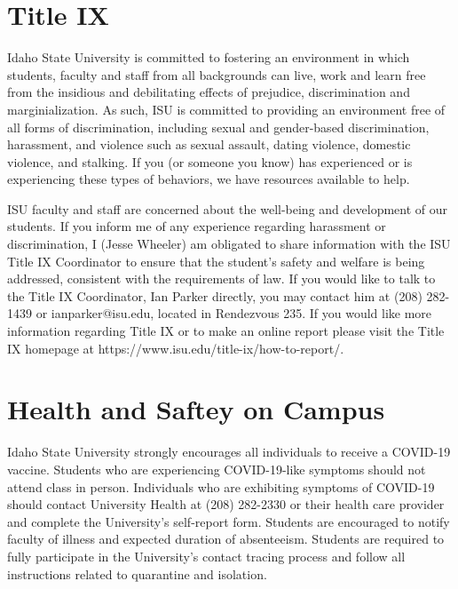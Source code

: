 \documentclass[11pt]{article}\usepackage[]{graphicx}\usepackage[]{xcolor}
\begin{document}
\section{Title IX}

Idaho State University is committed to fostering an environment in which students, faculty and staff from all backgrounds can live, work and learn free from the insidious and debilitating effects of prejudice, discrimination and marginialization.
As such, ISU is committed to providing an environment free of all forms of discrimination, including sexual and gender-based discrimination, harassment, and violence such as sexual assault, dating violence, domestic violence, and stalking.
If you (or someone you know) has experienced or is experiencing these types of behaviors, we have resources available to help.  

ISU faculty and staff are concerned about the well-being and development of our students. 
If you inform me of any experience regarding harassment or discrimination, I (Jesse Wheeler) am obligated to share information with the ISU Title IX Coordinator to ensure that the student’s safety and welfare is being addressed, consistent with the requirements of law.
If you would like to talk to the Title IX Coordinator, Ian Parker directly, you may contact him at (208) 282-1439 or ianparker@isu.edu, located in Rendezvous 235.
If you would like more information regarding Title IX or to make an online report please visit the Title IX homepage at https://www.isu.edu/title-ix/how-to-report/.

\section{Health and Saftey on Campus}

Idaho State University strongly encourages all individuals to receive a COVID-19 vaccine.
Students who are experiencing COVID-19-like symptoms should not attend class in person.
Individuals who are exhibiting symptoms of COVID-19 should contact University Health at (208) 282-2330 or their health care provider and complete the University’s self-report form.
Students are encouraged to notify faculty of illness and expected duration of absenteeism.
Students are required to fully participate in the University’s contact tracing process and follow all instructions related to quarantine and isolation.
\end{document}
